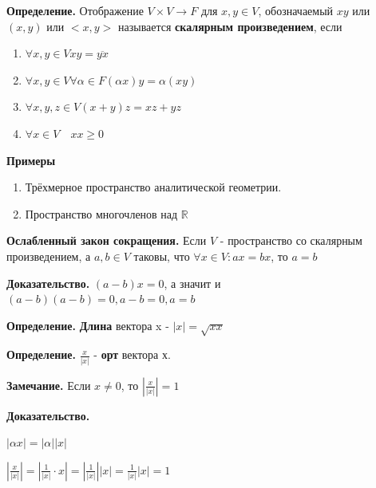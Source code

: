 \documentclass[a4paper]{article}
\begin{document}
    \newpage \begin{center}
                 \begin{Large}
                 \end{Large}
    \end{center}

    \textbf{Определение.} Отображение $V \times V \rightarrow F$ для $x, y \in V$, обозначаемый $xy$ или $(x,y)$ или $<x,y>$ называется \textbf{скалярным произведением}, если
    \begin{enumerate}
        \item $\forall x, y \in V xy =  \overline{yx}$
        \item $\forall x,y \in V \forall \alpha \in F (\alpha x) y = \alpha (xy)$
        \item $\forall x, y, z \in V (x+y)z = xz + yz$
        \item $\forall x \in V \quad xx \geq 0$
    \end{enumerate}
    \textbf{Примеры}

    \begin{enumerate}
        \item Трёхмерное пространство аналитической геометрии.
        \item Пространство многочленов над $\mathbb{R}$
    \end{enumerate}

    \begin{htheorem}
        \textbf{Ослабленный закон сокращения.} Если $V$ - пространство со скалярным произведением, а $a,b \in V$ таковы, что $\forall x \in V: ax = bx$, то $a=b$
    \end{htheorem}

    \begin{hproof}
        \textbf{Доказательство.} $(a-b)x = 0$, а значит и $(a-b)(a-b) = 0, a-b = 0, a=b$
    \end{hproof}

    \textbf{Определение.} \textbf{Длина} вектора x - $|x| = \sqrt{xx}$

    \textbf{Определение.} $\displaystyle \frac{x}{|x|}$ - \textbf{орт} вектора х.
    \begin{htheorem}
        \textbf{Замечание.} Если $x \neq 0$, то $\displaystyle \left| \frac{x}{|x|} \right| = 1$
    \end{htheorem}

    \begin{hproof}
        \textbf{Доказательство.}

        $|\alpha x| = |\alpha||x|$

        $\displaystyle  \left| \frac{x}{|x|} \right| =  \left| \frac{1}{|x|} \cdot x \right| =  \left| \frac{1}{|x|} \right| |x| =   \frac{1}{|x|} |x| = 1$
    \end{hproof}
\end{document}
